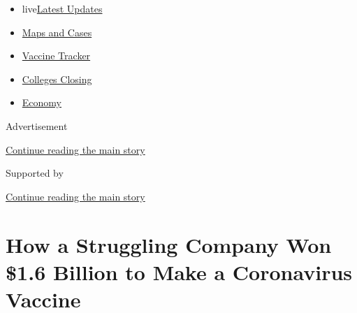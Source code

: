 \begin{itemize}
\tightlist
\item
  live\href{https://www.nytimes3xbfgragh.onion/2020/08/21/world/covid-19-coronavirus.html?name=styln-coronavirus-national\&region=TOP_BANNER\&variant=undefined\&block=storyline_menu_recirc\&action=click\&pgtype=Article\&impression_id=d84f7cc1-e39d-11ea-a4ee-ebb6d55f184c}{Latest
  Updates}
\item
  \href{https://www.nytimes3xbfgragh.onion/interactive/2020/us/coronavirus-us-cases.html?name=styln-coronavirus-national\&region=TOP_BANNER\&variant=undefined\&block=storyline_menu_recirc\&action=click\&pgtype=Article\&impression_id=d84fa3d0-e39d-11ea-a4ee-ebb6d55f184c}{Maps
  and Cases}
\item
  \href{https://www.nytimes3xbfgragh.onion/interactive/2020/science/coronavirus-vaccine-tracker.html?name=styln-coronavirus-national\&region=TOP_BANNER\&variant=undefined\&block=storyline_menu_recirc\&action=click\&pgtype=Article\&impression_id=d84fa3d1-e39d-11ea-a4ee-ebb6d55f184c}{Vaccine
  Tracker}
\item
  \href{https://www.nytimes3xbfgragh.onion/2020/08/19/us/colleges-closing-covid.html?name=styln-coronavirus-national\&region=TOP_BANNER\&variant=undefined\&block=storyline_menu_recirc\&action=click\&pgtype=Article\&impression_id=d84fa3d2-e39d-11ea-a4ee-ebb6d55f184c}{Colleges
  Closing}
\item
  \href{https://www.nytimes3xbfgragh.onion/live/2020/08/20/business/stock-market-today-coronavirus?name=styln-coronavirus-national\&region=TOP_BANNER\&variant=undefined\&block=storyline_menu_recirc\&action=click\&pgtype=Article\&impression_id=d84fa3d3-e39d-11ea-a4ee-ebb6d55f184c}{Economy}
\end{itemize}

Advertisement

\protect\hyperlink{after-top}{Continue reading the main story}

Supported by

\protect\hyperlink{after-sponsor}{Continue reading the main story}

\hypertarget{how-a-struggling-company-won-16-billion-to-make-a-coronavirus-vaccine}{%
\section{How a Struggling Company Won \$1.6 Billion to Make a
Coronavirus
Vaccine}\label{how-a-struggling-company-won-16-billion-to-make-a-coronavirus-vaccine}}


